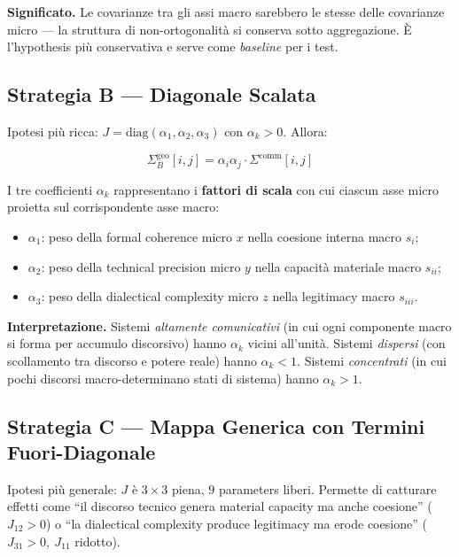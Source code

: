 \Hypoth{} \textbf{Significato.} Le covarianze tra gli assi macro
sarebbero le stesse delle covarianze micro --- la struttura di
non-ortogonalità si conserva sotto aggregazione. È l'hypothesis più
conservativa e serve come \emph{baseline} per i test.

\subsection{Strategia B --- Diagonale
Scalata}\label{strategia-b-diagonale-scalata}

Ipotesi più ricca: \(J = \text{diag}(\alpha_1, \alpha_2, \alpha_3)\) con
\(\alpha_k > 0\). Allora:

\[
\Sigma^{\text{geo}}_B[i,j] = \alpha_i \alpha_j \cdot \Sigma^{\text{comm}}[i,j]
\]

I tre coefficienti \(\alpha_k\) rappresentano i \textbf{fattori di
scala} con cui ciascun asse micro proietta sul corrispondente asse
macro:

\begin{itemize}
\tightlist
\item
  \(\alpha_1\): peso della formal coherence micro \(x\) nella coesione
  interna macro \(s_i\);
\item
  \(\alpha_2\): peso della technical precision micro \(y\) nella capacità
  materiale macro \(s_{ii}\);
\item
  \(\alpha_3\): peso della dialectical complexity micro \(z\) nella
  legitimacy macro \(s_{iii}\).
\end{itemize}

\Hypoth{} \textbf{Interpretazione.} Sistemi \emph{altamente
comunicativi} (in cui ogni componente macro si forma per accumulo
discorsivo) hanno \(\alpha_k\) vicini all'unità. Sistemi \emph{dispersi}
(con scollamento tra discorso e potere reale) hanno \(\alpha_k < 1\).
Sistemi \emph{concentrati} (in cui pochi discorsi macro-determinano
stati di sistema) hanno \(\alpha_k > 1\).

\subsection{Strategia C --- Mappa Generica con Termini
Fuori-Diagonale}\label{strategia-c-mappa-generica-con-termini-fuori-diagonale}

Ipotesi più generale: \(J\) è \(3 \times 3\) piena, \(9\) parameters
liberi. Permette di catturare effetti come ``il discorso tecnico genera
material capacity ma anche coesione'' (\(J_{12} > 0\)) o ``la
dialectical complexity produce legitimacy ma erode coesione''
(\(J_{31} > 0,\ J_{11}\) ridotto).

